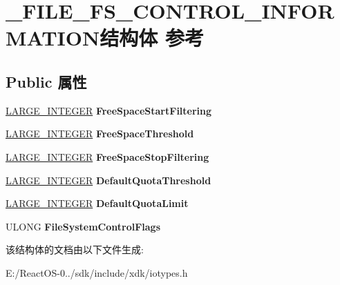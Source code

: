 \hypertarget{struct___f_i_l_e___f_s___c_o_n_t_r_o_l___i_n_f_o_r_m_a_t_i_o_n}{}\section{\+\_\+\+F\+I\+L\+E\+\_\+\+F\+S\+\_\+\+C\+O\+N\+T\+R\+O\+L\+\_\+\+I\+N\+F\+O\+R\+M\+A\+T\+I\+O\+N结构体 参考}
\label{struct___f_i_l_e___f_s___c_o_n_t_r_o_l___i_n_f_o_r_m_a_t_i_o_n}
\subsection*{Public 属性}
\begin{DoxyCompactItemize}
\item 
\mbox{\label{struct___f_i_l_e___f_s___c_o_n_t_r_o_l___i_n_f_o_r_m_a_t_i_o_n_a5b79458a71ddff417d2aa7e62d9dde34}} 
\hyperlink{union___l_a_r_g_e___i_n_t_e_g_e_r}{L\+A\+R\+G\+E\+\_\+\+I\+N\+T\+E\+G\+ER} {\bfseries Free\+Space\+Start\+Filtering}
\item 
\mbox{\label{struct___f_i_l_e___f_s___c_o_n_t_r_o_l___i_n_f_o_r_m_a_t_i_o_n_aa5e88d902d135572c1bade8d49c173b0}} 
\hyperlink{union___l_a_r_g_e___i_n_t_e_g_e_r}{L\+A\+R\+G\+E\+\_\+\+I\+N\+T\+E\+G\+ER} {\bfseries Free\+Space\+Threshold}
\item 
\mbox{\label{struct___f_i_l_e___f_s___c_o_n_t_r_o_l___i_n_f_o_r_m_a_t_i_o_n_a17226858886b561d39101b1bf242750d}} 
\hyperlink{union___l_a_r_g_e___i_n_t_e_g_e_r}{L\+A\+R\+G\+E\+\_\+\+I\+N\+T\+E\+G\+ER} {\bfseries Free\+Space\+Stop\+Filtering}
\item 
\mbox{\label{struct___f_i_l_e___f_s___c_o_n_t_r_o_l___i_n_f_o_r_m_a_t_i_o_n_a834a42876fbdbc7ff6af9584732ae67c}} 
\hyperlink{union___l_a_r_g_e___i_n_t_e_g_e_r}{L\+A\+R\+G\+E\+\_\+\+I\+N\+T\+E\+G\+ER} {\bfseries Default\+Quota\+Threshold}
\item 
\mbox{\label{struct___f_i_l_e___f_s___c_o_n_t_r_o_l___i_n_f_o_r_m_a_t_i_o_n_a60baa41cda57a55a08e743b3a420a617}} 
\hyperlink{union___l_a_r_g_e___i_n_t_e_g_e_r}{L\+A\+R\+G\+E\+\_\+\+I\+N\+T\+E\+G\+ER} {\bfseries Default\+Quota\+Limit}
\item 
\mbox{\label{struct___f_i_l_e___f_s___c_o_n_t_r_o_l___i_n_f_o_r_m_a_t_i_o_n_a292673fc446c6583ea76cda5a8592b9e}} 
U\+L\+O\+NG {\bfseries File\+System\+Control\+Flags}
\end{DoxyCompactItemize}


该结构体的文档由以下文件生成\+:\begin{DoxyCompactItemize}
\item 
E\+:/\+React\+O\+S-\/0../sdk/include/xdk/iotypes.\+h\end{DoxyCompactItemize}
